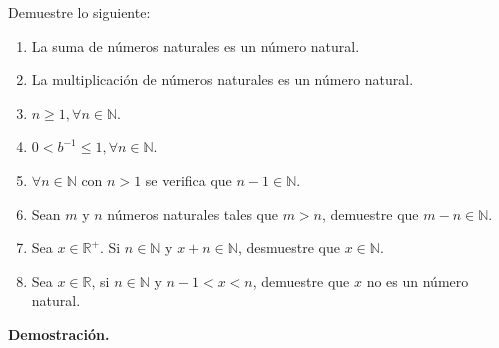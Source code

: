 \documentclass[11pt]{article}
\newcommand{\N}{\mathbb{N}}
\newcommand{\R}{\mathbb{R}}
\begin{document}
Demuestre lo siguiente:

\begin{enumerate}[label=\alph*)]
    \item La suma de números naturales es un número natural.
    \item La multiplicación de números naturales es un número natural.
    \item $n\geq 1, \forall n\in \N$.
    \item $0<b^{-1}\leq 1, \forall n\in \N$.
    \item $\forall n\in \N$ con $n>1$ se verifica que $n-1\in \N$.
    \item Sean $m$ y $n$ números naturales tales que $m>n$, demuestre que $m-n\in\N$.
    \item Sea $x\in \R^+$. Si $n\in \N$ y $x+n\in \N$, desmuestre que $x\in \N$.
    \item Sea $x\in \R$, si $n\in \N$ y $n-1<x<n$, demuestre que $x$ no es un número natural.
\end{enumerate}

\textbf{Demostración.}
\end{document}

